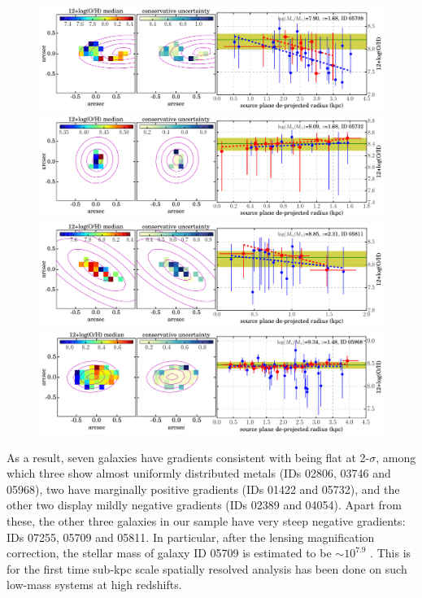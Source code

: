 \begin{figure}
    \centering
    \includegraphics[width=\textwidth]{fig_oh12grad/clM1149_id05709.pdf}
    \includegraphics[width=\textwidth]{fig_oh12grad/clM1149_id05732.pdf}
    \includegraphics[width=\textwidth]{fig_oh12grad/clM1149_id05811.pdf}
    \includegraphics[width=\textwidth]{fig_oh12grad/clM1149_id05968.pdf}
\end{figure}

As a result, seven galaxies have gradients consistent with being flat at 2-$\sigma$, among which three show almost uniformly
distributed metals (IDs 02806, 03746 and 05968), two have marginally positive gradients (IDs 01422 and 05732), and the other two
display mildly negative gradients (IDs 02389 and 04054). Apart from these, the other three galaxies in our sample have very steep
negative gradients: IDs 07255, 05709 and 05811. In particular, after the lensing magnification correction, the stellar mass of
galaxy ID 05709 is estimated to be $\sim10^{7.9}$ \Msun. This is for the first time sub-kpc scale spatially resolved analysis has
been done on such low-mass systems at high redshifts.

